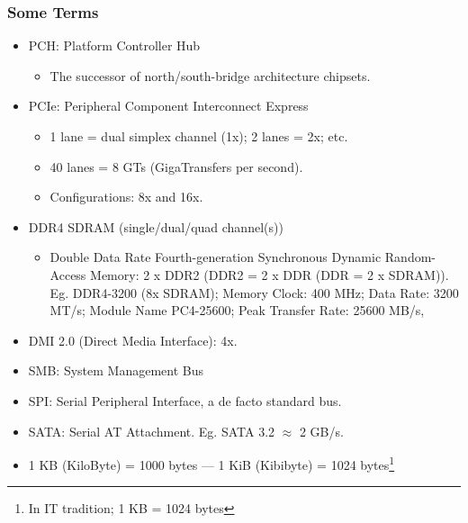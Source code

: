 \documentclass[aspectratio=169, xcolor=table, notheorems, hyperref={pdfpagelabels=false}]{beamer}
\begin{document}
\begin{frame}
\frametitle{Some Terms}
\begin{itemize}
\item PCH: Platform Controller Hub
\begin{itemize}
\item The successor of north/south-bridge architecture chipsets.
\end{itemize}
\item PCIe: Peripheral Component Interconnect Express
\begin{itemize}
\item 1 lane = dual simplex channel (1x); 2 lanes = 2x; etc.
\item 40 lanes = 8 GTs (GigaTransfers per second).
\item Configurations: 8x and 16x.
\end{itemize}
\item DDR4 SDRAM (single/dual/quad channel(s))
\begin{itemize}
\item Double Data Rate Fourth-generation Synchronous Dynamic Random-Access Memory:
      2 x DDR2 (DDR2 = 2 x DDR (DDR = 2 x SDRAM)).
      Eg. DDR4-3200 (8x SDRAM); Memory Clock: 400 MHz; Data Rate: 3200 MT/s; Module Name PC4-25600;
      Peak Transfer Rate: 25600 MB/s,
\end{itemize}
\item DMI 2.0 (Direct Media Interface): 4x.
\item SMB: System Management Bus
\item SPI: Serial Peripheral Interface, a de facto standard bus.
\item SATA:  Serial AT Attachment. Eg. SATA 3.2 $\approx$ 2 GB/s.
\item 1 KB (KiloByte) = 1000 bytes --- 1 KiB (Kibibyte) = 1024 bytes\footnote{%
      In IT tradition; 1 KB = 1024 bytes}
\end{itemize}
\end{frame}

\end{document}
